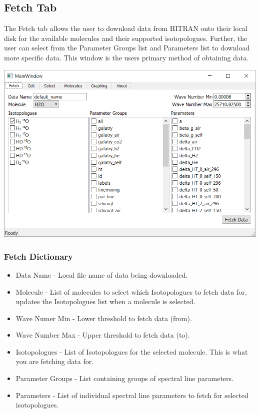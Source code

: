 \documentclass[12pt]{article}
\begin{document}
\subsection{Fetch Tab}
The Fetch tab allows the user to download data from HITRAN onto their local disk for the available molecules and their supported isotopologues. Further, the user can select from the Parameter Groups list and Parameters list to download more specific data. This window is the users primary method of obtaining data.
\begin{center}
\includegraphics[scale = 0.6]{MainWindow_Fetch}
\end{center}
\subsubsection{Fetch Dictionary}
\begin{itemize}
\item Data Name - Local file name of data being downloaded.
\item Molecule - List of molecules to select which Isotopologues to fetch data for, updates the Isotopologues list when a molecule is selected.
\item Wave Numer Min - Lower threshold to fetch data (from).
\item Wave Number Max - Upper threshold to fetch data (to).
\item Isotopologues - List of Isotopologues for the selected molecule. This is what you are fetching data for.
\item Parameter Groups - List containing groups of spectral line parameters.
\item Parameters - List of individual spectral line parameters to fetch for selected isotopologues.
\end{itemize}
\newpage
\end{document}
